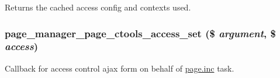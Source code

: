 Returns the cached access config and contexts used. \hypertarget{page__manager_8module_a7e332273ec4049ef62b8f95924f43b47}{
\subsubsection[{page\_\-manager\_\-page\_\-ctools\_\-access\_\-set}]{\setlength{\rightskip}{0pt plus 5cm}page\_\-manager\_\-page\_\-ctools\_\-access\_\-set (\$ {\em argument}, \/  \$ {\em access})}}
\label{page__manager_8module_a7e332273ec4049ef62b8f95924f43b47}
Callback for access control ajax form on behalf of \hyperlink{page_8inc}{page.inc} task.


